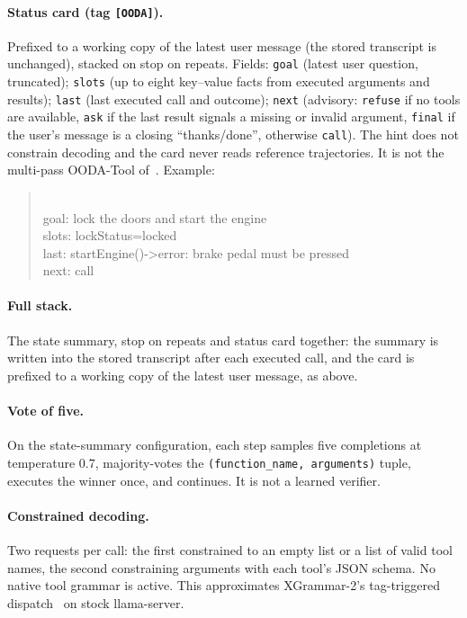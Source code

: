 \documentclass[11pt]{article}
\begin{document}
\paragraph{Status card (tag \texttt{[OODA]}).} Prefixed to a working copy of the latest user message (the stored transcript is unchanged), stacked on stop on repeats. Fields: \texttt{goal} (latest user question, truncated); \texttt{slots} (up to eight key--value facts from executed arguments and results); \texttt{last} (last executed call and outcome); \texttt{next} (advisory: \texttt{refuse} if no tools are available, \texttt{ask} if the last result signals a missing or invalid argument, \texttt{final} if the user's message is a closing ``thanks/done'', otherwise \texttt{call}). The hint does not constrain decoding and the card never reads reference trajectories. It is not the multi-pass OODA-Tool of~\cite{guo2026ooda}. Example:
\begin{quote}\footnotesize\ttfamily
[OODA]\\ goal: lock the doors and start the engine\\ slots: lockStatus=locked\\ last: startEngine()->error: brake pedal must be pressed\\ next: call
\end{quote}

\paragraph{Full stack.} The state summary, stop on repeats and status card together: the summary is written into the stored transcript after each executed call, and the card is prefixed to a working copy of the latest user message, as above.

\paragraph{Vote of five.} On the state-summary configuration, each step samples five completions at temperature 0.7, majority-votes the \texttt{(function\_name, arguments)} tuple, executes the winner once, and continues. It is not a learned verifier.

\paragraph{Constrained decoding.} Two requests per call: the first constrained to an empty list or a list of valid tool names, the second constraining arguments with each tool's JSON schema. No native tool grammar is active. This approximates XGrammar-2's tag-triggered dispatch~\cite{dong2026xgrammar2} on stock llama-server.
\end{document}
